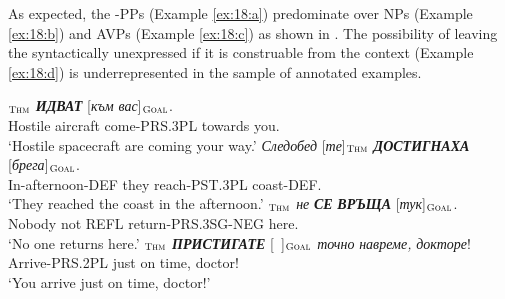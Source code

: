 \documentclass[output=paper,colorlinks,citecolor=brown]{langscibook}
\begin{document}
As expected, the -PPs (Example \ref{ex:18:a}) predominate over NPs  (Example \ref{ex:18:b}) and AVPs (Example \ref{ex:18:c}) as shown in . The possibility of leaving the  syntactically unexpressed if it is construable from the context (Example \ref{ex:18:d}) is underrepresented in the sample of annotated examples.

\begin{exe}
\ex \label{ex:18}
\begin{xlist}
\ex \label{ex:18:a}
$_{\text{\textsc{Thm}}}$ \textit{\textbf{ИДВАТ}} [\textit{към} \textit{вас}]$_{\text{\textsc{Goal}}}$. \\
Hostile aircraft come-PRS.3PL towards you. \\
\glt `Hostile spacecraft are coming your way.'
\ex \label{ex:18:b}
\gll \textit{Следобед} [\textit{те}]$_{\text{\textsc{Thm}}}$ \textit{\textbf{ДОСТИГНАХА}} [\textit{брега}]$_{\text{\textsc{Goal}}}$. \\
In-afternoon-DEF they reach-PST.3PL coast-DEF. \\
\glt `They reached the coast in the afternoon.'
\ex \label{ex:18:c}
$_{\text{\textsc{Thm}}}$ \textit{не} \textit{\textbf{СЕ}} \textit{\textbf{ВРЪЩА}} [\textit{тук}]$_{\text{\textsc{Goal}}}$. \\
Nobody not REFL return-PRS.3SG-NEG here. \\
\glt `No one returns here.'
\ex \label{ex:18:d}
\gll [\textit{\ }]$_{\text{\textsc{Thm}}}$ \textit{\textbf{ПРИСТИГАТЕ}} [\textit{\ }]$_{\text{\textsc{Goal}}}$ \textit{точно} \textit{навреме,} \textit{докторе}! \\
{} Arrive-PRS.2PL {} just {on time}, doctor! \\
\glt `You arrive just on time, doctor!'
\end{xlist}
\end{exe}
\end{document}
